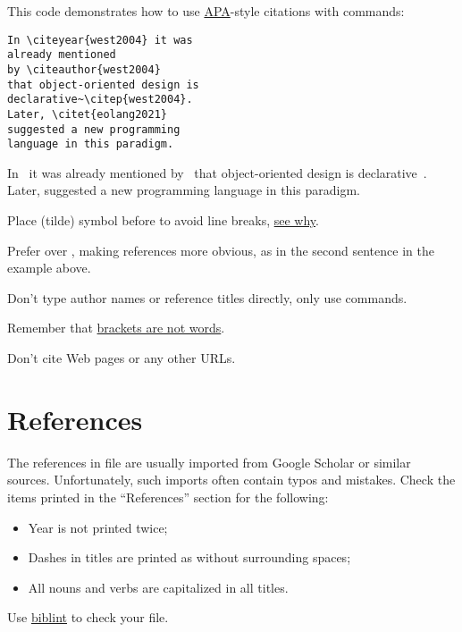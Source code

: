 \documentclass[12pt,nonacm,natbib=false]{acmart}
\begin{document}
This code demonstrates how to use \href{https://libguides.murdoch.edu.au/APA}{APA}-style citations with \href{https://journals.aas.org/natbib/}{} commands:

\begin{multicols}{2}
\setlength{\parskip}{0pt}
\small
\raggedcolumns
\begin{verbatim}
In \citeyear{west2004} it was
already mentioned
by \citeauthor{west2004}
that object-oriented design is
declarative~\citep{west2004}.
Later, \citet{eolang2021}
suggested a new programming
language in this paradigm.
\end{verbatim}

\columnbreak

\raggedright
In~\citeyear{west2004} it was already
mentioned by~\citeauthor{west2004} that
object-oriented design is
declarative~\citep{west2004}.
Later, \citet{eolang2021}
suggested a new programming
language in this paradigm.

\AtNextBibliography{\small}
\setlength\bibitemsep{3pt}
{\raggedright\printbibliography[heading=none]}
\end{multicols}

Place \ff{\~} (tilde) symbol before  to avoid line breaks, \href{https://tex.stackexchange.com/questions/41264/what-is-the-difference-in-citing-referencing-with-or-without-tilde}{see why}.

Prefer  over , making references more obvious, as in the second sentence in the example above.

Don't type author names or reference titles directly, only use  commands.

Remember that \href{https://www.ece.ucdavis.edu/~jowens/biberrors.html}{brackets are not words}.

Don't cite Web pages or any other URLs.

\section{References}

The references in  file are usually imported from Google Scholar or similar sources. Unfortunately, such imports often contain typos and mistakes. Check the items printed in the ``References'' section for the following:

\begin{itemize}
    \item Year is not printed twice;
    \item Dashes in titles are printed as \ff{-{}-{}-} without surrounding spaces;
    \item All nouns and verbs are capitalized in all titles.
\end{itemize}

Use \href{https://github.com/Kingsford-Group/biblint}{biblint} to check your  file.
\end{document}
